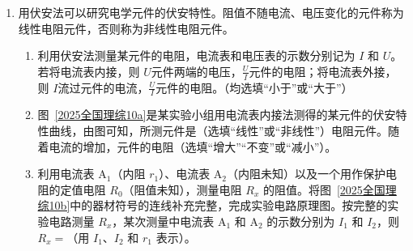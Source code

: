\documentclass[\gkver]{gaokaozhenti}
\begin{document}
\begin{enumerate}
\item
用伏安法可以研究电学元件的伏安特性。阻值不随电流、电压变化的元件称为线性电阻元件，否则称为非线性电阻元件。
\begin{enumerate}
	\item
	利用伏安法测量某元件的电阻，电流表和电压表的示数分别记为 $I$ 和 $U$。若将电流表内接，则 $U$元件两端的电压，$\frac{U}{I}$元件的电阻；将电流表外接，则 $I$流过元件的电流，$\frac{U}{I}$元件的电阻。（均选填“小于”或“大于”）
	\item
	图~\ref{2025全国理综10a}是某实验小组用电流表内接法测得的某元件的伏安特性曲线，由图可知，所测元件是（选填“线性”或“非线性”）电阻元件。随着电流的增加，元件的电阻（选填“增大”“不变”或“减小”）。
	\item
	利用电流表 A$_{1}$（内阻 $r_{1}$）、电流表 A$_{2}$（内阻未知）以及一个用作保护电阻的定值电阻 $R_{0}$（阻值未知），测量电阻 $R_{x}$ 的阻值。将图~\ref{2025全国理综10b}中的器材符号的连线补充完整，完成实验电路原理图\tkanswer[3cm]{}。按完整的实验电路测量 $R_{x}$，某次测量中电流表 A$_{1}$ 和 A$_{2}$ 的示数分别为 $I_{1}$ 和 $I_{2}$，则 $R_{x} = $（用 $I_{1}$、$I_{2}$ 和 $r_{1}$ 表示）。
\end{enumerate}


\end{enumerate}
\end{document}
